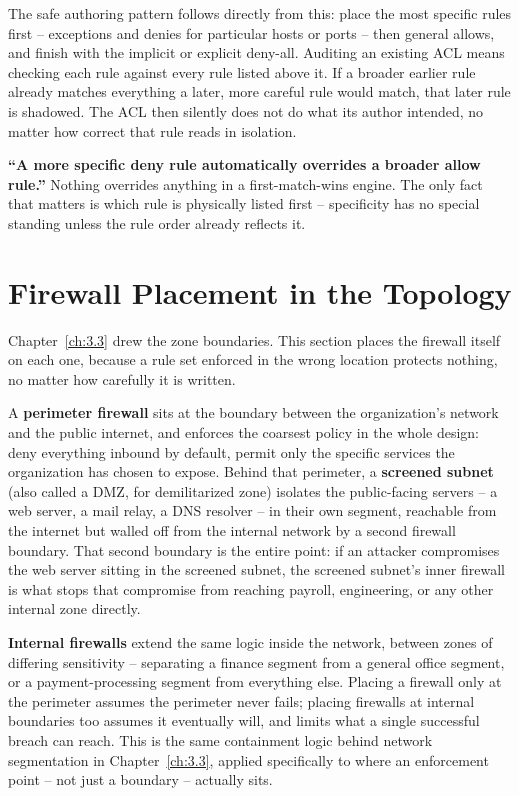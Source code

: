 The safe authoring pattern follows directly from this: place the most specific rules first --
exceptions and denies for particular hosts or ports -- then general allows, and finish with the
implicit or explicit deny-all. Auditing an existing ACL means checking each rule against every rule
listed above it. If a broader earlier rule already matches everything a later, more careful rule
would match, that later rule is shadowed. The ACL then silently does not do what its author
intended, no matter how correct that rule reads in isolation.

\begin{misconception}
\textbf{``A more specific deny rule automatically overrides a broader allow rule.''} Nothing
overrides anything in a first-match-wins engine. The only fact that matters is which rule is
physically listed first -- specificity has no special standing unless the rule order already
reflects it.
\end{misconception}

\section{Firewall Placement in the Topology}

Chapter~\ref{ch:3.3} drew the zone boundaries. This section places the firewall itself on each one,
because a rule set enforced in the wrong location protects nothing, no matter how carefully it is
written.

A \textbf{perimeter firewall} sits at the boundary between the organization's network and the
public internet, and enforces the coarsest policy in the whole design: deny everything inbound by
default, permit only the specific services the organization has chosen to expose. Behind that
perimeter, a \textbf{screened subnet} (also called a DMZ, for demilitarized zone) isolates the
public-facing servers -- a web server, a mail relay, a DNS resolver -- in their own segment,
reachable from the internet but walled off from the internal network by a second firewall boundary.
That second boundary is the entire point: if an attacker compromises the web server sitting in the
screened subnet, the screened subnet's inner firewall is what stops that compromise from reaching
payroll, engineering, or any other internal zone directly.

\textbf{Internal firewalls} extend the same logic inside the network, between zones of differing
sensitivity -- separating a finance segment from a general office segment, or a payment-processing
segment from everything else. Placing a firewall only at the perimeter assumes the perimeter never
fails; placing firewalls at internal boundaries too assumes it eventually will, and limits what a
single successful breach can reach. This is the same containment logic behind network segmentation
in Chapter~\ref{ch:3.3}, applied specifically to where an enforcement point -- not just a
boundary -- actually sits.

